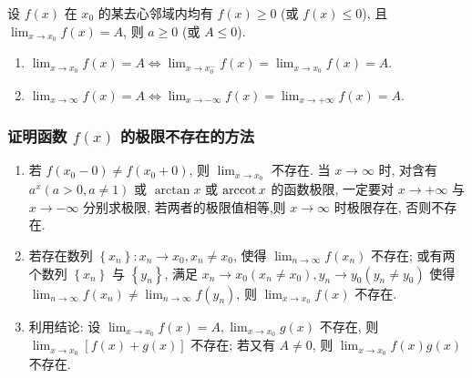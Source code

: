 \begin{theorem}[函数极限的保号性]
    设 $f(x)$ 在 $x_0$ 的某去心邻域内均有 $f(x)\geqslant 0$ (或 $f(x)\leqslant 0$), 且 $\displaystyle\lim_{x\to x_0}f(x)=A$, 则 $a\geqslant 0$ (或 $A\leqslant 0$).
\end{theorem}

\begin{theorem}[函数极限的充要条件]
    \begin{enumerate}[label=(\arabic{*})]
        \item $\displaystyle\lim _{x \rightarrow x_{0}} f(x)=A \Leftrightarrow \lim _{x \rightarrow x_{0}^{-}} f(x)=\lim _{x \rightarrow x_{0}} f(x)=A $.
        \item $\displaystyle\lim _{x \rightarrow \infty} f(x)=A \Leftrightarrow \lim _{x \rightarrow-\infty} f(x)=\lim _{x \rightarrow+\infty} f(x)=A .$
    \end{enumerate}
\end{theorem}

\subsubsection{证明函数 $ f(x) $ 的极限不存在的方法}

\begin{enumerate}[label=(\arabic{*})]
    \item 若 $ f\left(x_{0}-0\right) \neq f\left(x_{0}+0\right)$, 则 $\displaystyle \lim _{x \rightarrow x_{0}} $ 不存在. 当 $ x \rightarrow \infty $ 时, 对含有 $ a^{x}(a>0, a \neq 1) $ 或 $ \arctan x $ 或 $ \arccot x $ 的函数极限, 一定要对 $ x \rightarrow+\infty $ 与 $ x \rightarrow-\infty $ 分别求极限, 若两者的极限值相等,则 $ x \rightarrow \infty $ 时极限存在, 否则不存在.
    \item 若存在数列 $ \left\{x_{n}\right\}: x_{n} \rightarrow x_{0}, x_{n} \neq x_{0} $, 使得 $\displaystyle \lim _{n \rightarrow \infty} f\left(x_{n}\right) $ 不存在; 或有两个数列 $ \left\{x_{n}\right\} $ 与 $ \left\{y_{n}\right\} $, 满足 $ x_{n} \rightarrow x_{0}\left(x_{n} \neq x_{0}\right), y_{n} \rightarrow y_{0}\left(y_{n} \neq y_{0}\right) $ 使得 $ \displaystyle\lim _{n \rightarrow \infty} f\left(x_{n}\right) \neq \lim _{n \rightarrow \infty} f\left(y_{n}\right) $, 则 $ \displaystyle\lim _{x \rightarrow x_{0}} f(x) $ 不存在.
    \item 利用结论: 设 $\displaystyle \lim _{x \rightarrow x_{0}} f(x)=A, \lim _{x \rightarrow x_{0}} g(x) $ 不存在, 则 $\displaystyle \lim _{x \rightarrow x_{0}}[f(x)+g(x)] $ 不存在; 若又有 $ A \neq 0 $, 则 $ \displaystyle\lim _{x \rightarrow x_{0}} f(x) g(x) $ 不存在.
\end{enumerate}

